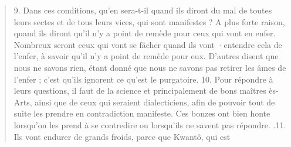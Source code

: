 \begin{quote}
\begin{Synthesis}
\begin{quote}
\end{quote}
\end{Synthesis}
9. Dans ces conditions, qu'en sera-t-il quand ils diront du mal
de toutes leurs sectes et de tous leurs vices, qui sont manifestes ?
A plus forte raison, quand ils diront qu'il n'y a point de remède
pour ceux qui vont en enfer. Nombreux seront ceux qui vont se
fâcher quand ils vont ·entendre cela de l'enfer, à savoir qu'il n'y
a point de remède pour eux. D'autres disent que nous ne savons
rien, étant donné que nous ne savons pas retirer les âmes de
l'enfer ; c'est qu'ils ignorent ce qu'est le purgatoire.
10. Pour répondre à leurs questions, il faut de la science et principalement
de bons maîtres ès-Arts, ainsi que de ceux qui seraient
dialecticiens, afin de pouvoir tout de suite les prendre en contradiction
manifeste. Ces bonzes ont bien honte lorsqu'on les prend
à se contredire ou lorsqu'ils ne savent pas répondre.
.11. Ils vont endurer de grands froids, parce que Kwantô, qui est
\end{quote}

